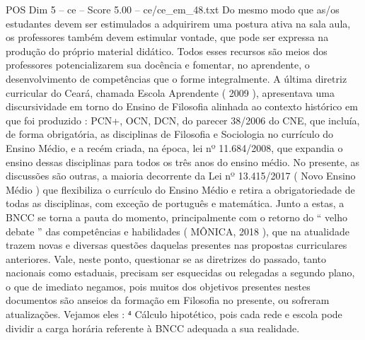 \begin{textsample}{POS Dim 5 – ce – Score 5.00 – ce/ce\_em\_48.txt}
Do mesmo modo que as/os estudantes devem ser estimulados a adquirirem uma postura ativa na sala aula, os professores também devem estimular vontade, que pode ser expressa na produção do próprio material didático.
Todos esses recursos são meios dos professores potencializarem sua docência e fomentar, no aprendente, o desenvolvimento de competências que o forme integralmente.
A última diretriz curricular do Ceará, chamada Escola Aprendente ( 2009 ), apresentava uma discursividade em torno do Ensino de Filosofia alinhada ao contexto histórico em que foi produzido : PCN+, OCN, DCN, do parecer 38/2006 do CNE, que incluía, de forma obrigatória, as disciplinas de Filosofia e Sociologia no currículo do Ensino Médio, e a recém criada, na época, lei nº 11.684/2008, que expandia o ensino dessas disciplinas para todos os três anos do ensino médio.
No presente, as discussões são outras, a maioria decorrente da Lei nº 13.415/2017 ( Novo Ensino Médio ) que flexibiliza o currículo do Ensino Médio e retira a obrigatoriedade de todas as disciplinas, com exceção de português e matemática.
Junto a estas, a BNCC se torna a pauta do momento, principalmente com o retorno do “ velho debate ” das competências e habilidades ( MÔNICA, 2018 ), que na atualidade trazem novas e diversas questões daquelas presentes nas propostas curriculares anteriores.
Vale, neste ponto, questionar se as diretrizes do passado, tanto nacionais como estaduais, precisam ser esquecidas ou relegadas a segundo plano, o que de imediato negamos, pois muitos dos objetivos presentes nestes documentos são anseios da formação em Filosofia no presente, ou sofreram atualizações.
Vejamos eles : ⁴ Cálculo hipotético, pois cada rede e escola pode dividir a carga horária referente à BNCC adequada a sua realidade.

\end{textsample}
